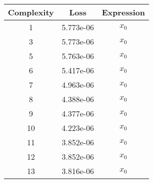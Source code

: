 \begin{center}
        \begin{tabular}{|c|c|c|}
        \hline
        Complexity & Loss & Expression \\
        \hline
        1 & 5.773e-06 & $\begin{aligned}x_{0}\end{aligned}$\\ \hline3 & 5.773e-06 & $\begin{aligned}x_{0}\end{aligned}$\\ \hline5 & 5.763e-06 & $\begin{aligned}x_{0}\end{aligned}$\\ \hline6 & 5.417e-06 & $\begin{aligned}x_{0}\end{aligned}$\\ \hline7 & 4.963e-06 & $\begin{aligned}x_{0}\end{aligned}$\\ \hline8 & 4.388e-06 & $\begin{aligned}x_{0}\end{aligned}$\\ \hline9 & 4.377e-06 & $\begin{aligned}x_{0}\end{aligned}$\\ \hline10 & 4.223e-06 & $\begin{aligned}x_{0}\end{aligned}$\\ \hline11 & 3.852e-06 & $\begin{aligned}x_{0}\end{aligned}$\\ \hline12 & 3.852e-06 & $\begin{aligned}x_{0}\end{aligned}$\\ \hline13 & 3.816e-06 & $\begin{aligned}x_{0}\end{aligned}$\\ \hline\end{tabular}
        \end{center}
        